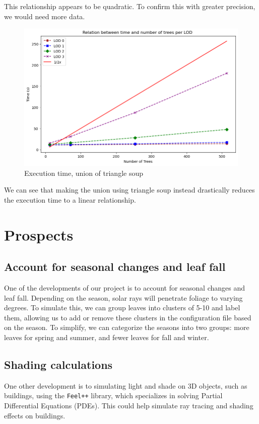 \documentclass[12pt]{article}
\begin{document}
This relationship appears to be quadratic. To confirm this with
greater precision, we would need more data.

\begin{figure}[H]
    \centering
    \includegraphics[width=1\textwidth]{images/bench_time_ntree_linear.png}
    \caption{Execution time, union of triangle soup}
\end{figure}

We can see that making the union using triangle soup instead drastically reduces the
execution time to a linear relationship.

\newpage

\section{Prospects}

\subsection{Account for seasonal changes and leaf fall}
One of the developments of our project is to account for seasonal changes and
leaf fall. Depending on the season, solar rays will penetrate foliage to
varying degrees. To simulate this, we can group leaves into clusters of 5-10
and label them, allowing us to add or remove these clusters in the
configuration file based on the season. To simplify, we can categorize the
seasons into two groups: more leaves for spring and summer, and fewer leaves
for fall and winter.

\subsection{Shading calculations}
One other development is to simulating light and shade on 3D objects, such as
buildings, using the \texttt{Feel++}\cite{feel++} library, which specializes in
solving Partial Differential Equations (PDEs). This could help simulate ray
tracing and shading effects on buildings.
\end{document}
